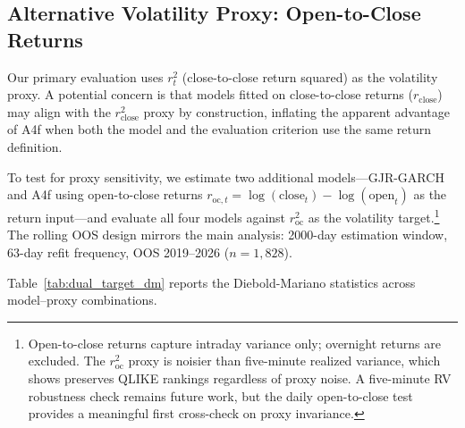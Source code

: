 
\subsection{Alternative Volatility Proxy: Open-to-Close Returns}
\label{sec:proxy_oc}

Our primary evaluation uses $r_t^2$ (close-to-close return squared) as the volatility proxy.
A potential concern is that models fitted on close-to-close returns ($r_{\mathrm{close}}$)
may align with the $r_{\mathrm{close}}^2$ proxy by construction, inflating the apparent advantage
of A4f when both the model and the evaluation criterion use the same return definition.

To test for proxy sensitivity, we estimate two additional models---GJR-GARCH and A4f
using open-to-close returns $r_{\mathrm{oc},t} = \log(\text{close}_t) - \log(\text{open}_t)$
as the return input---and evaluate all four models against $r_{\mathrm{oc}}^2$ as the
volatility target.\footnote{Open-to-close returns capture intraday variance only;
overnight returns are excluded. The $r_{\mathrm{oc}}^2$ proxy is noisier than
five-minute realized variance, which \citet{patton2011} shows preserves QLIKE rankings
regardless of proxy noise. A five-minute RV robustness check remains future work, but
the daily open-to-close test provides a meaningful first cross-check on proxy invariance.}
The rolling OOS design mirrors the main analysis: 2000-day estimation window,
63-day refit frequency, OOS 2019--2026 ($n = 1{,}828$).

Table~\ref{tab:dual_target_dm} reports the Diebold-Mariano statistics
across model--proxy combinations.

